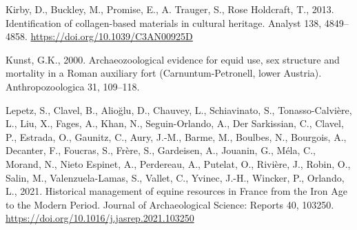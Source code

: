\documentclass[preprint, 3p, authoryear]{elsarticle} %
\newlength{\cslhangindent}
\newlength{\cslentryspacingunit} %
\newenvironment{CSLReferences}[2] %
 {%
  \setlength{\parindent}{0pt}
  \ifodd #1
  \let\oldpar\par
  \def\par{\hangindent=\cslhangindent\oldpar}
  \fi
  \setlength{\parskip}{#2\cslentryspacingunit}
 }%
 {}
\begin{document}
\begin{CSLReferences}{1}{0}
\leavevmode{}%
Kirby, D., Buckley, M., Promise, E., A. Trauger, S., Rose Holdcraft, T., 2013. Identification of collagen-based materials in cultural heritage. Analyst 138, 4849--4858. \url{https://doi.org/10.1039/C3AN00925D}

\leavevmode{}%
Kunst, G.K., 2000. Archaeozoological evidence for equid use, sex structure and mortality in a {Roman} auxiliary fort ({Carnuntum-Petronell}, lower {Austria}). Anthropozoologica 31, 109--118.

\leavevmode{}%
Lepetz, S., Clavel, B., Alioğlu, D., Chauvey, L., Schiavinato, S., Tonasso-Calvière, L., Liu, X., Fages, A., Khan, N., Seguin-Orlando, A., Der Sarkissian, C., Clavel, P., Estrada, O., Gaunitz, C., Aury, J.-M., Barme, M., Boulbes, N., Bourgois, A., Decanter, F., Foucras, S., Frère, S., Gardeisen, A., Jouanin, G., Méla, C., Morand, N., Nieto Espinet, A., Perdereau, A., Putelat, O., Rivière, J., Robin, O., Salin, M., Valenzuela-Lamas, S., Vallet, C., Yvinec, J.-H., Wincker, P., Orlando, L., 2021. Historical management of equine resources in {France} from the {Iron Age} to the {Modern Period}. Journal of Archaeological Science: Reports 40, 103250. \url{https://doi.org/10.1016/j.jasrep.2021.103250}


\end{CSLReferences}
\end{document}

